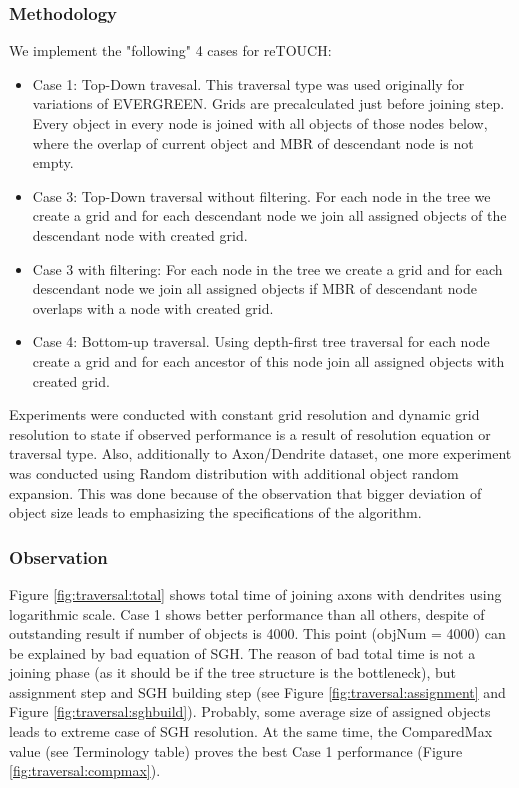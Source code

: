 \documentclass{sig-alternate}
\newcommand{\fref}[1]{Figure \ref{#1}}
\begin{document}
\subsubsection{Methodology}
We implement the "following" 4 cases  for reTOUCH:
\begin{itemize}
\item Case 1: Top-Down travesal. This traversal type was used originally for variations of EVERGREEN. Grids are precalculated just before joining step. Every object in every node is joined with all objects of those nodes below, where the overlap of current object and MBR of descendant node is not empty.
\item Case 3: Top-Down traversal without filtering. For each node in the tree we create a grid and for each descendant node we join all assigned objects of the descendant node with created grid.
\item Case 3 with filtering: For each node in the tree we create a grid and for each descendant node we join all assigned objects if MBR of descendant node overlaps with a node with created grid.
\item Case 4: Bottom-up traversal. Using depth-first tree traversal for each node create a grid and for each ancestor of this node join all assigned objects with created grid.
\end{itemize}

Experiments were conducted with constant grid resolution and dynamic grid resolution to state if observed performance is a result of resolution equation or traversal type. Also, additionally to Axon/Dendrite dataset, one more experiment was conducted using Random distribution with additional object random expansion. This was done because of the observation that bigger deviation of object size leads to emphasizing the specifications of the algorithm.

\subsubsection{Observation}

\fref{fig:traversal:total} shows total time of joining axons with dendrites using logarithmic scale. Case 1 shows better performance than all others, despite of outstanding result if number of objects is 4000. 
This point (objNum = 4000) can be explained by bad equation of SGH. The reason of bad total time is not a joining phase (as it should be if the tree structure is the bottleneck), but assignment step and SGH building step (see \fref{fig:traversal:assignment} and \fref{fig:traversal:sghbuild}). Probably, some average size of assigned objects leads to extreme case of SGH resolution. At the same time, the ComparedMax value (see Terminology table) proves the best Case 1 performance (\fref{fig:traversal:compmax}).
\end{document}
